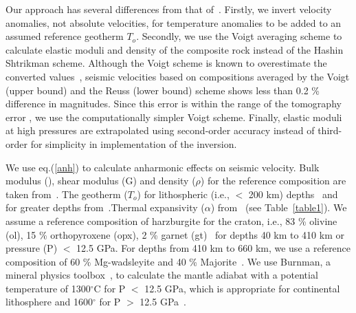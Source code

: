 \documentclass[draft,linenumbers]{agujournal2018}
\begin{document}
Our approach has several differences from that of~\citet{Cammarano2003}. Firstly, we invert velocity anomalies, not absolute velocities, for temperature anomalies to be added to an assumed reference geotherm $T_o$.  Secondly, we use the Voigt  averaging scheme to calculate elastic moduli and density of the composite rock instead of the Hashin Shtrikman scheme. Although the Voigt scheme is known to overestimate the converted values~\citep{watt_1976}, seismic velocities based on compositions averaged by the Voigt (upper bound) and the Reuss (lower bound) scheme shows less than 0.2 \% difference in magnitudes. Since this error is within the range of the tomography error \citep{Biryol_2016}, we use the computationally simpler Voigt scheme. Finally, elastic moduli at high pressures are extrapolated using second-order accuracy instead of third-order for simplicity in implementation of the inversion.

 We use eq.(\ref{anh}) to calculate anharmonic effects on seismic velocity. Bulk modulus (), shear modulus (G) and density ($\rho$) for the reference  composition  are taken from~\citet{Cammarano2003}. The  geotherm ($T_o$) for lithospheric (i.e., $<$ 200 km) depths~\citep{Goes_2002} and for greater depths from~\citet{turcotte2014geodynamics}.Thermal expansivity ($\alpha$) from~\citet{saxena_data} (see Table~\ref{table1}). We assume a reference composition of harzburgite for the craton, i.e., 83 \% olivine (ol), 15 \% orthopyroxene (opx), 2 \% garnet (gt)~\citep{mcdonough1998mineralogy} for depths 40 km to 410 km or pressure (P) $<$ 12.5 GPa. For depths from 410 km to 660 km, we use a reference composition of 60 \% Mg-wadsleyite and 40 \% Majorite~\citep{haggerty1995upper}. We use Burnman, a mineral physics toolbox~\citep{cottaar2014burnman}, to calculate the mantle adiabat with a potential temperature of 1300$^{\circ}$C for P $<$ 12.5 GPa, which is appropriate for continental lithosphere \citep{rudnick1998thermal} and 1600$^{\circ}$ for P $>$ 12.5 GPa~\citep{katsura2010adiabatic}. 
\end{document}
